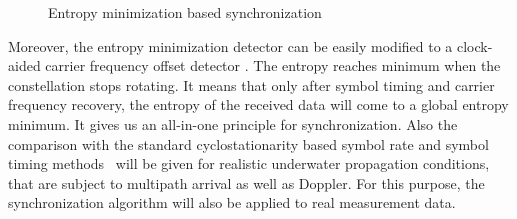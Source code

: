 \documentclass[conference, onecolumn]{IEEEtran}
\begin{document}
\begin{figure}[htbp]
  \centering
  \hspace{0.2in} %
  
    \caption{Entropy minimization based synchronization}
    \label{fig:entropy} %
\end{figure}

Moreover, the entropy minimization detector can be easily modified to a clock-aided carrier frequency offset detector \cite{Pedzisz2006}.
The entropy reaches minimum when the constellation stops rotating. 
It means that only after symbol timing and carrier frequency recovery, 
the entropy of the received data will come to a global entropy minimum.
It gives us an all-in-one principle for synchronization.
Also the comparison with the standard cyclostationarity based symbol rate \cite{Wu2012} and symbol timing methods~\cite{Wang2004a} will be given for realistic underwater propagation conditions, 
that are subject to multipath arrival as well as Doppler. 
For this purpose, the synchronization algorithm will also be applied to real measurement data. 





\vspace{-0.2cm}

% 

\end{document}
